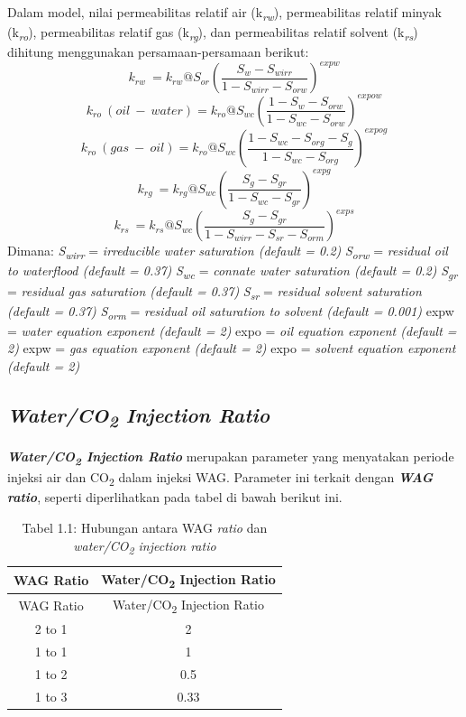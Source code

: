 \documentclass[
]{book}
\begin{document}
Dalam model, nilai permeabilitas relatif air (k\textsubscript{\emph{rw}}), permeabilitas relatif minyak (k\textsubscript{\emph{ro}}), permeabilitas relatif gas (k\textsubscript{\emph{rg}}), dan permeabilitas relatif solvent (k\textsubscript{\emph{rs}}) dihitung menggunakan persamaan-persamaan berikut:
\[k_{rw}\ = k_{rw}@S_{or} \left( \frac{S_w-S_{wirr}}{1-S_{wirr}-S_{orw}} \right)^{expw} \]
\[k_{ro}\ (oil\ -\ water) = k_{ro}@S_{wc} \left( \frac{1-S_w-S_{orw}}{1-S_{wc}-S_{orw}} \right)^{expow} \]
\[k_{ro}\ (gas\ -\ oil) = k_{ro}@S_{wc} \left( \frac{1-S_{wc}-S_{org}-S_g}{1-S_{wc}-S_{org}} \right)^{expog} \]
\[k_{rg}\ = k_{rg}@S_{wc} \left( \frac{S_g-S_{gr}}{1-S_{wc}-S_{gr}} \right)^{expg} \]
\[k_{rs}\ = k_{rs}@S_{wc} \left( \frac{S_g-S_{gr}}{1-S_{wirr}-S_{sr}-S_{orm}} \right)^{exps} \]
Dimana:
\emph{S\textsubscript{wirr}} = \emph{irreducible water saturation (default = 0.2)}
\emph{S\textsubscript{orw}} = \emph{residual oil to waterflood (default = 0.37)}
\emph{S\textsubscript{wc}} = \emph{connate water saturation (default = 0.2)}
\emph{S\textsubscript{gr}} = \emph{residual gas saturation (default = 0.37)}
\emph{S\textsubscript{sr}} = \emph{residual solvent saturation (default = 0.37)}
\emph{S\textsubscript{orm}} = \emph{residual oil saturation to solvent (default = 0.001)}
expw = \emph{water equation exponent (default = 2)}
expo = \emph{oil equation exponent (default = 2)}
expw = \emph{gas equation exponent (default = 2)}
expo = \emph{solvent equation exponent (default = 2)}

\hypertarget{waterco2-injection-ratio}{%
\subsection{\texorpdfstring{\emph{Water/CO\textsubscript{2} Injection Ratio}}{Water/CO2 Injection Ratio}}\label{waterco2-injection-ratio}}

\textbf{\emph{Water/CO\textsubscript{2} Injection Ratio}} merupakan parameter yang menyatakan periode injeksi air dan CO\textsubscript{2} dalam injeksi WAG. Parameter ini terkait dengan \textbf{\emph{WAG ratio}}, seperti diperlihatkan pada tabel di bawah berikut ini.

\begin{longtable}[]{@{}cc@{}}
\caption{{ Tabel 1.1: Hubungan antara WAG \emph{ratio} dan \emph{water/CO\textsubscript{2} injection ratio} }}\tabularnewline
\toprule
WAG Ratio & Water/CO\textsubscript{2} Injection Ratio\tabularnewline
\midrule
\endfirsthead
\toprule
WAG Ratio & Water/CO\textsubscript{2} Injection Ratio\tabularnewline
\midrule
\endhead
2 to 1 & 2\tabularnewline
1 to 1 & 1\tabularnewline
1 to 2 & 0.5\tabularnewline
1 to 3 & 0.33\tabularnewline
\bottomrule
\end{longtable}
\end{document}
